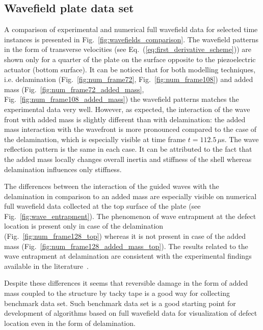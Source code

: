\documentclass[preprint,12pt]{elsarticle}
\begin{document}
	\subsection{Wavefield plate data set }
	A comparison of experimental and numerical full wavefield data for selected time instances is presented in Fig.~\ref{fig:wavefields_comparison}. The wavefield patterns in the form of transverse velocities (see Eq.~(\ref{eq:first_derivative_scheme})) are shown only for a quarter of the plate on the surface opposite to the piezoelectric actuator (bottom surface). It can be noticed that for both modelling techniques, i.e. delamination (Fig.~\ref{fig:num_frame72}, Fig.~\ref{fig:num_frame108}) and added mass (Fig.~\ref{fig:num_frame72_added_mass}, Fig.~\ref{fig:num_frame108_added_mass})	the wavefield patterns matches the experimental data very well. However, as expected, the interaction of the wave front with added mass is slightly different than with delamination: the added mass interaction with the wavefront is more pronounced compared to the case of the delamination, which is especially visible at time frame $t=112.5\,  \mu$s. The wave reflection pattern is the same in each case. It can be attributed to the fact that the added mass locally changes overall inertia and stiffness of the shell whereas delamination influences only stiffness. 
	
	The differences between the interaction of the guided waves with the delamination in comparison to an added mass are especially visible on numerical full wavefield data collected at the top surface of the plate (see Fig.~\ref{fig:wave_entrapment}). The phenomenon of wave entrapment at the defect location is present only in case of the delamination (Fig.~\ref{fig:num_frame128_top}) whereas it is not present in case of the added mass (Fig.~\ref{fig:num_frame128_added_mass_top}). The results related to the wave entrapment at delamination are consistent with the experimental findings available in the literature~\cite{Glushkov2012}. 
	
	Despite these differences it seems that reversible damage in the form of added mass coupled to the structure by tacky tape is a good way for collecting benchmark data set. Such benchmark data set is a good starting point for development of algorithms based on full wavefield data for visualization of defect location even in the form of delamination.
	
\end{document}
